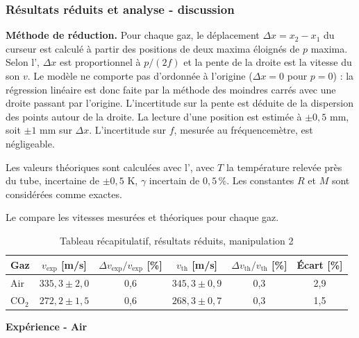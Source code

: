 \subsubsection{Résultats réduits et analyse - discussion}

\textbf{Méthode de réduction.} Pour chaque gaz, le déplacement $\Delta x = x_2 - x_1$ du curseur est calculé à partir des positions de deux maxima éloignés de $p$ maxima. Selon l', $\Delta x$ est proportionnel à $p/(2f)$ et la pente de la droite est la vitesse du son $v$. Le modèle ne comporte pas d'ordonnée à l'origine ($\Delta x = 0$ pour $p = 0$) : la régression linéaire est donc faite par la méthode des moindres carrés avec une droite passant par l'origine. L'incertitude sur la pente est déduite de la dispersion des points autour de la droite. La lecture d'une position est estimée à $\pm 0{,}5$ mm, soit $\pm 1$ mm sur $\Delta x$. L'incertitude sur $f$, mesurée au fréquencemètre, est négligeable.

Les valeurs théoriques sont calculées avec l', avec $T$ la température relevée près du tube, incertaine de $\pm 0{,}5$ K, $\gamma$ incertain de $0{,}5\,\%$. Les constantes $R$ et $M$ sont considérées comme exactes.

Le  compare les vitesses mesurées et théoriques pour chaque gaz.

\begin{table}[H]
    \centering
    \small
    \begin{tabular}{lccccc}
        \toprule
        Gaz & $v_{\text{exp}}$ [m/s] & $\Delta v_{\text{exp}}/v_{\text{exp}}$ [\%] & $v_{\text{th}}$ [m/s] & $\Delta v_{\text{th}}/v_{\text{th}}$ [\%] & Écart [\%] \\
        \midrule
        Air         & $335{,}3 \pm 2{,}0$ & 0,6 & $345{,}3 \pm 0{,}9$ & 0,3 & 2,9 \\
        CO$_2$      & $272{,}2 \pm 1{,}5$ & 0,6 & $268{,}3 \pm 0{,}7$ & 0,3 & 1,5 \\
        \bottomrule
    \end{tabular}
    \caption{Tableau récapitulatif, résultats réduits, manipulation 2}
    \label{tab:recapitulatif-trombone}
\end{table}

\medskip

\textbf{Expérience - Air}\nopagebreak[4]

